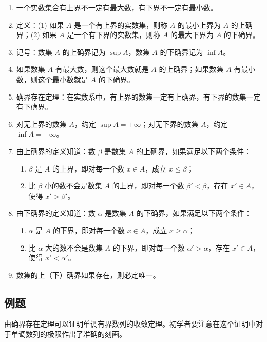 \begin{enumerate}
  \item 一个实数集合有上界不一定有最大数，有下界不一定有最小数。
  \item 定义：(1) 如果 $A$ 是一个有上界的实数集，则称 $A$ 的最小上界为 $A$ 的上确界；(2) 如果 $A$ 是一个有下界的实数集，则称 $A$ 的最大下界为 $A$ 的下确界。
  \item 记号：数集 $A$ 的上确界记为 $\sup A$，数集 $A$ 的下确界记为 $\inf A$。
  \item 如果数集 $A$ 有最大数，则这个最大数就是 $A$ 的上确界；如果数集 $A$ 有最小数，则这个最小数就是 $A$ 的下确界。
  \item 确界存在定理：在实数系中，有上界的数集一定有上确界，有下界的数集一定有下确界。
  \item 对无上界的数集 $A$，约定 $\sup A=+\infty$；对无下界的数集 $A$，约定 $\inf A=-\infty$。
  \item 由上确界的定义知道：数 $\beta$ 是数集 $A$ 的上确界，如果满足以下两个条件：
  \begin{enumerate}[label=(\arabic*)]
    \item $\beta$ 是 $A$ 的上界，即对每一个数 $x\in A$，成立 $x\leqslant\beta$；
    \item 比 $\beta$ 小的数不会是数集 $A$ 的上界，即对每一个数 $\beta'<\beta$，存在 $x'\in A$，使得 $x'>\beta'$。
  \end{enumerate}
  \item 由下确界的定义知道：数 $\alpha$ 是数集 $A$ 的下确界，如果满足以下两个条件：
  \begin{enumerate}[label=(\arabic*)]
    \item $\alpha$ 是 $A$ 的下界，即对每一个数 $x\in A$，成立 $x\geqslant\alpha$；
    \item 比 $\alpha$ 大的数不会是数集 $A$ 的下界，即对每一个数 $\alpha'>\alpha$，存在 $x'\in A$，使得 $x'<\alpha'$。
  \end{enumerate}
  \item 数集的上（下）确界如果存在，则必定唯一。
\end{enumerate}

\subsection{例题}

由确界存在定理可以证明单调有界数列的收敛定理。初学者要注意在这个证明中对于单调数列的极限作出了准确的刻画。

